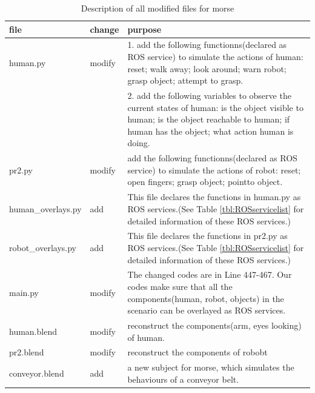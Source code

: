 \begin{table}[h]
 	\centering
 	\begin{tabular}{|p{3.5cm}|p{1.5cm}|p{6cm}|}
 		\hline
 		file 				&	change 	&	purpose				\\ \hline
 		human.py			& 	modify		&	1. add the following functionns(declared as ROS service) to simulate the actions of human:	reset; walk away; look around; warn robot; grasp object; attempt to grasp. \\
 							&				& 	2. add the following variables to observe the current states of human: is the object visible to human; is the object reachable to human; if human has the object; what action human is doing.			\\ \hline
 		pr2.py				& 	modify		&	add the following functionns(declared as ROS service) to simulate the actions of robot: reset; open fingers; grasp object; pointto object.																\\ \hline
		human\_overlays.py	&	add			&	This file declares the functions in human.py as ROS services.(See Table \ref{tbl:ROSservicelist} for detailed information of these ROS services.)															\\ \hline
		robot\_overlays.py	&	add			&	This file declares the functions in pr2.py as ROS services.(See Table \ref{tbl:ROSservicelist} for detailed information of these ROS services.)															\\ \hline
		main.py				&	modify		&	The changed codes are in Line 447-467. Our codes make sure that all the components(human, robot, objects) in the scenario can be overlayed as ROS services.											\\ \hline
		human.blend			&	modify		&	reconstruct the components(arm, eyes looking) of human.													\\ \hline
		pr2.blend			&	modify		&	reconstruct the components of robobt																				\\ \hline
		conveyor.blend		&	add			&	a new subject for morse, which simulates the behaviours of a conveyor belt. 										\\ \hline
 	\end{tabular}
 	\caption{Description of all modified files for morse}
 	\label{tbl:morsetable}
\end{table}

